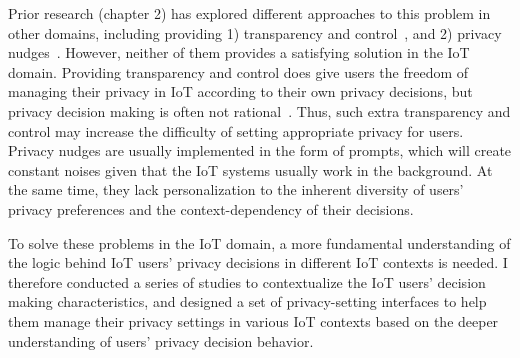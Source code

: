 Prior research (chapter 2) has explored different approaches to this problem in other domains, including providing 1) transparency and control~\cite{egelman2009timing,acquisti2006imagined,knijnenburg2015user,benisch2011capturing,brodie2004personalization}, and 2) privacy nudges~\cite{almuhimedi2015your,liu2016follow,fu2014field,liu2016follow}. However, neither of them provides a satisfying solution in the IoT domain. Providing transparency and control does give users the freedom of managing their privacy in IoT according to their own privacy decisions, but privacy decision making is often not rational~\cite{knijnenburg2015user}. Thus, such extra transparency and control may increase the difficulty of setting appropriate privacy for users. Privacy nudges are usually implemented in the form of prompts, which will create constant noises given that the IoT systems usually work in the background. At the same time, they lack personalization to the inherent diversity of users’ privacy preferences and the context-dependency of their decisions.

To solve these problems in the IoT domain, a more fundamental understanding of the logic behind IoT users' privacy decisions in different IoT contexts is needed. I therefore conducted a series of studies to contextualize the IoT users' decision making characteristics, and designed a set of privacy-setting interfaces to help them manage their privacy settings in various IoT contexts based on the deeper understanding of users' privacy decision behavior. 

